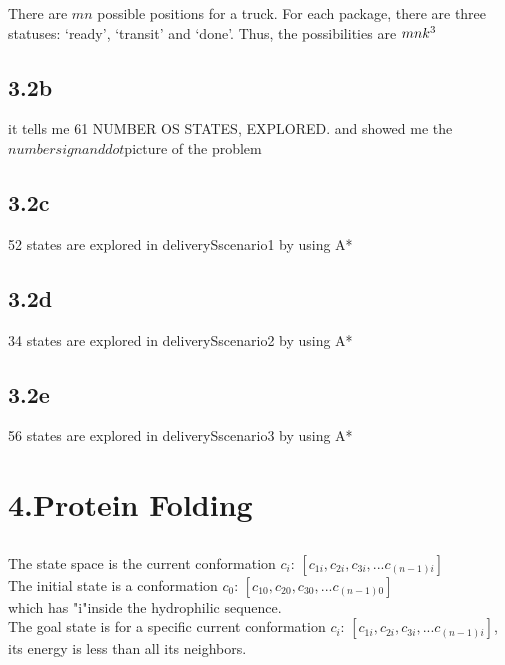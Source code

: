 \documentclass[12pt]{article}
\begin{document}
		There are ${mn}$ possible positions for a truck. For each package, there are three statuses: `ready', `transit' and `done'. Thus, the possibilities are ${mn\*k^3}$\\
	
	\subsection{3.2b}
	it tells me 61 NUMBER OS STATES, EXPLORED. and showed me the $number sign and dot$picture of the problem
	
	
	
	
	
	\subsection{3.2c}
		
			52 states are explored in deliverySscenario1 by using A*
	
	\subsection{3.2d}
		
			34 states are explored in deliverySscenario2 by using A*
	
	\subsection{3.2e}
		
			56 states are explored in deliverySscenario3 by using A*

\section{4.Protein Folding}
	\subsection{}
		
		The state space is the current conformation ${c_i}$: $[c_{1i}, c_{2i}, c_{3i}, ... c_{(n-1)i}]$\\
	
		The initial state is a conformation ${c_0}$: $[c_{10}, c_{20}, c_{30}, ... c_{(n-1)0}]$ \\which has "i"inside the hydrophilic sequence.\\
		
		The goal state is for a specific current conformation ${c_i}$: $[c_{1i}, c_{2i}, c_{3i}, ... c_{(n-1)i}]$, its energy is less than all its neighbors. \\
		
\end{document}
